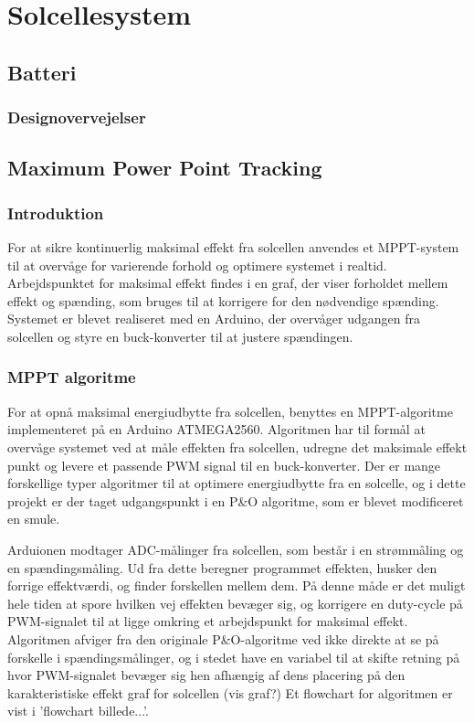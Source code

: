 \documentclass[../main.tex]{subfiles}
\begin{document}
\chapter{Solcellesystem} \label{Chap:Solcellesystem}

\section{Batteri}

    \subsection{Designovervejelser}

\section{Maximum Power Point Tracking}

    \subsection{Introduktion}

For at sikre kontinuerlig maksimal effekt fra solcellen anvendes et MPPT-system til at overvåge for varierende forhold og optimere systemet i realtid. Arbejdspunktet for maksimal effekt findes i en graf, der viser forholdet mellem effekt og spænding, som bruges til at korrigere for den nødvendige spænding. Systemet er blevet realiseret med en Arduino, der overvåger udgangen fra solcellen og styre en buck-konverter til at justere spændingen.

    \subsection{MPPT algoritme}

    For at opnå maksimal energiudbytte fra solcellen, benyttes en MPPT-algoritme implementeret på en Arduino ATMEGA2560. Algoritmen har til formål at overvåge systemet ved at måle effekten fra solcellen, udregne det maksimale effekt punkt og levere et passende PWM signal til en buck-konverter. Der er mange forskellige typer algoritmer til at optimere energiudbytte fra en solcelle, og i dette projekt er der taget udgangspunkt i en P&O algoritme, som er blevet modificeret en smule. 
    
    Arduionen modtager ADC-målinger fra solcellen, som består i en strømmåling og en spændingsmåling. Ud fra dette beregner programmet effekten, husker den forrige effektværdi, og finder forskellen mellem dem. På denne måde er det muligt hele tiden at spore hvilken vej effekten bevæger sig, og korrigere en duty-cycle på PWM-signalet til at ligge omkring et arbejdspunkt for maksimal effekt. Algoritmen afviger fra den originale P&O-algoritme ved ikke direkte at se på forskelle i spændingsmålinger, og i stedet have en variabel til at skifte retning på hvor PWM-signalet bevæger sig hen afhængig af dens placering på den karakteristiske effekt graf for solcellen (vis graf?) Et flowchart for algoritmen er vist i 'flowchart billede...'. 
\end{document}
